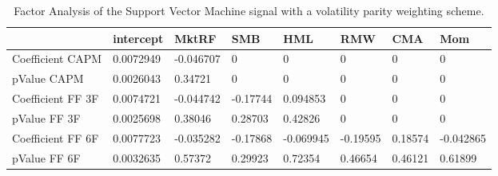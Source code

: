 \begin{table}[H]
\centering
\begin{tabular}{llllllll}
\hline& intercept & MktRF & SMB & HML & RMW & CMA & Mom \\ 
\hline 
Coefficient CAPM & 0.0072949 & -0.046707 & 0 & 0 & 0 & 0 & 0 \\ 
pValue CAPM & 0.0026043 & 0.34721 & 0 & 0 & 0 & 0 & 0 \\ 
Coefficient FF 3F & 0.0074721 & -0.044742 & -0.17744 & 0.094853 & 0 & 0 & 0 \\ 
pValue FF 3F & 0.0025698 & 0.38046 & 0.28703 & 0.42826 & 0 & 0 & 0 \\ 
Coefficient FF 6F & 0.0077723 & -0.035282 & -0.17868 & -0.069945 & -0.19595 & 0.18574 & -0.042865 \\ 
pValue FF 6F & 0.0032635 & 0.57372 & 0.29923 & 0.72354 & 0.46654 & 0.46121 & 0.61899 \\ 
\hline
\end{tabular}
\caption{Factor Analysis of the Support Vector Machine signal with a volatility parity weighting scheme.}
\label{SVM_MODEL_FACTOR}
\end{table}